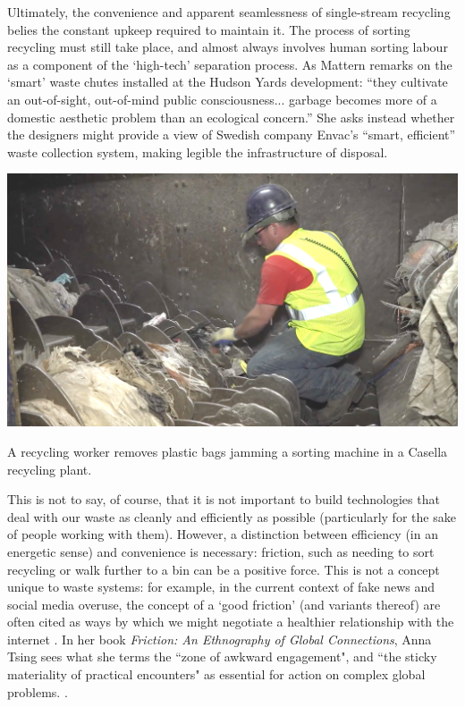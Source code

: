 \documentclass[nofonts,nols,justified,nobib]{tufte-book}
\begin{document}
Ultimately, the convenience and apparent seamlessness of single-stream recycling belies the constant upkeep required to maintain it. The process of sorting recycling must still take place, and almost always involves human sorting labour as a component of the `high-tech' separation process. As Mattern remarks on the `smart' waste chutes installed at the Hudson Yards development: ``they cultivate an out-of-sight, out-of-mind public consciousness... garbage becomes more of a domestic aesthetic problem than an ecological concern.'' She asks instead whether the designers might provide a view of Swedish company Envac's ``smart, efficient'' waste collection system, making legible the infrastructure of disposal. \cite{mattern_instrumental_2016}

\begin{marginfigure}
\includegraphics[width=\textwidth]{img/1/casella-plastic-bag.png}
\caption{A recycling worker removes plastic bags jamming a sorting machine in a Casella recycling plant. \cite{casella_recycle_2018}}
\end{marginfigure}

This is not to say, of course, that it is not important to build technologies that deal with our waste as cleanly and efficiently as possible (particularly for the sake of people working with them). However, a distinction between efficiency (in an energetic sense) and convenience is necessary: friction, such as needing to sort recycling or walk further to a bin can be a positive force. This is not a concept unique to waste systems: for example, in the current context of fake news and social media overuse, the concept of a `good friction' (and variants thereof) are often cited as ways by which we might negotiate a healthier relationship with the internet \cite{donath_signals_2011, tufekci_twitter_2017}. In her book \emph{Friction: An Ethnography of Global Connections}, Anna Tsing sees what she terms the ``zone of awkward engagement", and ``the sticky materiality of practical encounters" as essential for action on complex global problems. \cite{tsing_friction_2005}. %
\end{document}

